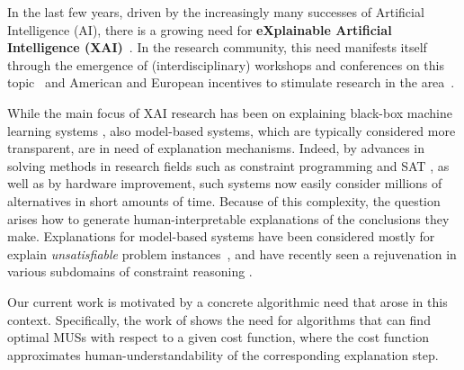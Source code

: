 
In the last few years, driven by the increasingly many successes of Artificial Intelligence (AI), there is a growing need for \textbf{eXplainable Artificial Intelligence (XAI)}~\cite{miller2019explanation}.
In the research community, this need manifests itself through the emergence of (interdisciplinary) workshops and conferences on this topic~\cite{xai-ijcai,FAT} and American and European incentives to stimulate research in the area~\cite{gunning2017explainable,hamonrobustness,chistera,fetproact}. 

While the main focus of XAI research has been on explaining black-box machine learning systems \cite{lundberg2017unified,guidotti2018survey,ignatiev2019abduction}, also model-based systems, which are typically considered more transparent, are in need of explanation mechanisms. 
Indeed, by advances in solving methods in research fields such as constraint programming \cite{fai/Rossi06} and SAT \cite{faia/2009-185}, as well as by hardware improvement, such systems now easily consider millions of alternatives in short amounts of time. 
Because of this complexity, the question arises how to generate human-interpretable explanations of the conclusions they make. 
Explanations for model-based systems have been considered mostly for explain \textit{unsatisfiable} problem instances~\cite{junker2001quickxplain}, and have recently seen a rejuvenation in various subdomains of constraint reasoning \cite{fox2017explainable,vcyras2019argumentation,chakraborti2017plan,ecai/BogaertsGCG20}.

Our current work is motivated by a concrete algorithmic need that arose in this context. 
Specifically, the work of \citet{ecai/BogaertsGCG20} shows the need for algorithms that can find optimal MUSs with respect to a given cost function, where the cost function approximates human-understandability of the corresponding explanation step.

